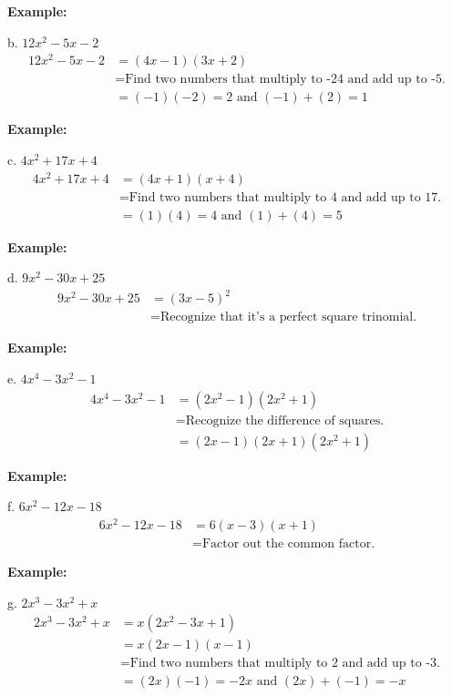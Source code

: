 \documentclass[12pt,a4paper]{article}
\newenvironment{example}
  {\begin{framed}\colorbox{examplecolor}{
  \parbox{\dimexpr\linewidth-2\fboxsep}{
  \textbf{Example:}}}}
  {\end{framed}}
\begin{document}
\begin{example}
b. $12x^2 - 5x - 2$
\begin{align*}
12x^2 - 5x - 2 &= (4x - 1)(3x + 2) \\
&= \text{Find two numbers that multiply to -24 and add up to -5.} \\
&= (-1)(-2) = 2 \text{ and } (-1) + (2) = 1
\end{align*}
\end{example}

\begin{example}
c. $4x^2 + 17x + 4$
\begin{align*}
4x^2 + 17x + 4 &= (4x + 1)(x + 4) \\
&= \text{Find two numbers that multiply to 4 and add up to 17.} \\
&= (1)(4) = 4 \text{ and } (1) + (4) = 5
\end{align*}
\end{example}

\begin{example}
d. $9x^2 - 30x + 25$
\begin{align*}
9x^2 - 30x + 25 &= (3x - 5)^2 \\
&= \text{Recognize that it's a perfect square trinomial.}
\end{align*}
\end{example}

\begin{example}
e. $4x^4 - 3x^2 - 1$
\begin{align*}
4x^4 - 3x^2 - 1 &= (2x^2 - 1)(2x^2 + 1) \\
&= \text{Recognize the difference of squares.} \\
&= (2x - 1)(2x + 1)(2x^2 + 1)
\end{align*}
\end{example}

\begin{example}
f. $6x^2 - 12x - 18$
\begin{align*}
6x^2 - 12x - 18 &= 6(x - 3)(x + 1) \\
&= \text{Factor out the common factor.}
\end{align*}
\end{example}

\begin{example}
g. $2x^3 - 3x^2 + x$
\begin{align*}
2x^3 - 3x^2 + x &= x(2x^2 - 3x + 1) \\
&= x(2x - 1)(x - 1) \\
&= \text{Find two numbers that multiply to 2 and add up to -3.} \\
&= (2x)(-1) = -2x \text{ and } (2x) + (-1) = -x
\end{align*}
\end{example}
\end{document}
